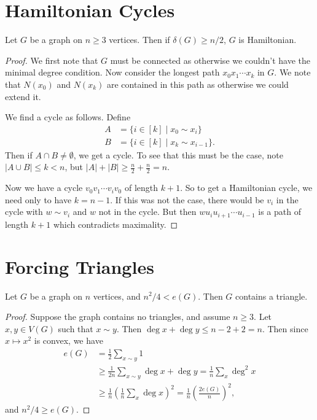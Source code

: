 \documentclass[a3paper, 10pt]{article}
\begin{document}
\begin{multicols*}{5}
\section{Hamiltonian Cycles}

\begin{theorem}
    Let $G$ be a graph on $n \geq 3$ vertices. Then if $\delta (G) \geq n/2$, $G$ is Hamiltonian.
\end{theorem}
\begin{proof}
    We first note that $G$ must be connected as otherwise we couldn't have the minimal degree condition. 
    Now consider the longest path $x_0 x_1 \cdots x_k$ in $G$.
    We note that $N(x_0)$ and $N(x_k)$ are contained in this path as otherwise we could extend it.

    We find a cycle as follows. Define 
    \begin{align*}
        A &= \{i \in [k] \mid x_0 \sim x_i \} \\
        B &= \{i \in [k] \mid x_k \sim x_{i - 1}\}.
    \end{align*}
    Then if $A \cap B \neq \emptyset$, we get a cycle. To see that this must be the case, note $|A \cup B| \leq k < n$, but $|A| + |B| \geq \frac{n}{2} + \frac{n}{2} = n$.

    Now we have a cycle $v_0 v_1 \cdots v_i v_0$ of length $k + 1$. So to get a Hamiltonian cycle, we need only to have $k = n - 1$. If this was not the case, there would be $v_i$ in the cycle with $w \sim v_i$ and $w$ not in the cycle. But then $w u_i u_{i + 1} \cdots u_{i - 1}$ is a path of length $k + 1$ which contradicts maximality.
\end{proof}

\section{Forcing Triangles}

\begin{theorem}
    Let $G$ be a graph on $n$ vertices, and $n^2/4 < e(G)$. Then $G$ contains a triangle.
\end{theorem}
\begin{proof}
    Suppose the graph contains no triangles, and assume $n \geq 3$. Let $x, y \in V(G)$ such that $x \sim y$. Then $\deg x + \deg y \leq n - 2 + 2 = n$. Then since $x \mapsto x^2$ is convex, we have
    \begin{align*}
        e(G) &= \frac{1}{2} \sum_{x \sim y} 1 \\
        &\geq \frac{1}{2n} \sum_{x \sim y} \deg x + \deg y = \frac{1}{n} \sum_x \deg^2 x\\
        &\geq \frac{1}{n} \left(\frac{1}{n} \sum_x \deg x\right)^2 = \frac{1}{n} \left(\frac{2e(G)}{n}\right)^2,
    \end{align*}
    and $n^2/4 \geq e(G)$.
\end{proof}


\end{multicols*}
\end{document}
